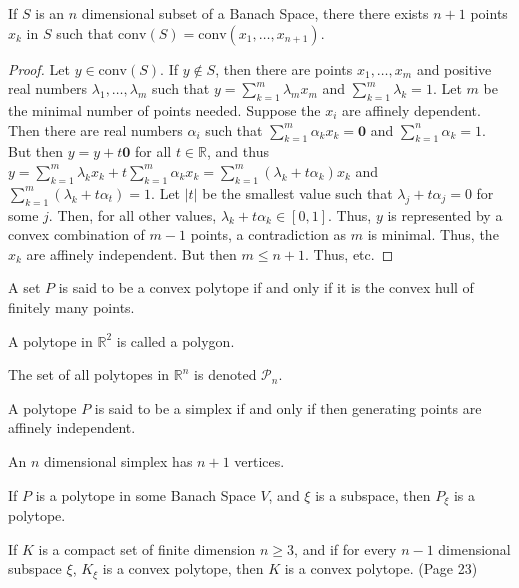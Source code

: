 \documentclass[crop=false,class=book]{standalone}
\begin{document}
\begin{theorem}
If $S$ is an $n$ dimensional subset of a Banach Space, there there exists $n+1$ points $x_k$ in $S$ such that $\textrm{conv}(S) = \textrm{conv}(x_1,\hdots, x_{n+1})$.
\end{theorem}
\begin{proof}
Let $y\in \textrm{conv}(S)$. If $y\notin S$, then there are points $x_1,\hdots, x_m$ and positive real numbers $\lambda_1,\hdots, \lambda_m$ such that $y=\sum_{k=1}^{m}\lambda_m x_m$ and $\sum_{k=1}^{m}\lambda_k = 1$. Let $m$ be the minimal number of points needed. Suppose the $x_i$ are affinely dependent. Then there are real numbers $\alpha_i$ such that $\sum_{k=1}^{m}\alpha_k x_k = \mathbf{0}$ and $\sum_{k=1}^{n}\alpha_k =1$. But then $y = y+t\mathbf{0}$ for all $t\in \mathbb{R}$, and thus $y = \sum_{k=1}^{m}\lambda_k x_k + t\sum_{k=1}^{m}\alpha_k x_k = \sum_{k=1}^{m}(\lambda_k + t\alpha_k)x_k$ and $\sum_{k=1}^{m}(\lambda_k+t\alpha_t) = 1$. Let $|t|$ be the smallest value such that $\lambda_j + t\alpha_j = 0$ for some $j$. Then, for all other values, $\lambda_k + t\alpha_k \in [0,1]$. Thus, $y$ is represented by a convex combination of $m-1$ points, a contradiction as $m$ is minimal. Thus, the $x_k$ are affinely independent. But then $m \leq n+1$. Thus, etc.
\end{proof}
\begin{definition}
A set $P$ is said to be a convex polytope if and only if it is the convex hull of finitely many points.
\end{definition}
\begin{definition}
A polytope in $\mathbb{R}^2$ is called a polygon.
\end{definition}
\begin{notation}
The set of all polytopes in $\mathbb{R}^n$ is denoted $\mathscr{P}_n$.
\end{notation}
\begin{definition}
A polytope $P$ is said to be a simplex if and only if then generating points are affinely independent.
\end{definition}
\begin{theorem}
An $n$ dimensional simplex has $n+1$ vertices.
\end{theorem}
\begin{theorem}
If $P$ is a polytope in some Banach Space $V$, and $\xi$ is a subspace, then $P_{\xi}$ is a polytope.
\end{theorem}
\begin{theorem}
If $K$ is a compact set of finite dimension $n\geq 3$, and if for every $n-1$ dimensional subspace $\xi$, $K_{\xi}$ is a convex polytope, then $K$ is a convex polytope. (Page 23)
\end{theorem}
\end{document}
